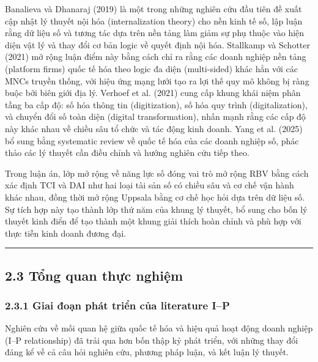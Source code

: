 \documentclass[12pt,a4paper]{article}
\begin{document}
Banalieva và Dhanaraj (2019) là một trong những nghiên cứu đầu tiên đề
xuất cập nhật lý thuyết nội hóa (internalization theory) cho nền kinh tế
số, lập luận rằng dữ liệu số và tương tác dựa trên nền tảng làm giảm sự
phụ thuộc vào hiện diện vật lý và thay đổi cơ bản logic về quyết định
nội hóa. Stallkamp và Schotter (2021) mở rộng luận điểm này bằng cách
chỉ ra rằng các doanh nghiệp nền tảng (platform firms) quốc tế hóa theo
logic đa diện (multi-sided) khác hẳn với các MNCs truyền thống, với hiệu
ứng mạng lưới tạo ra lợi thế quy mô không bị ràng buộc bởi biên giới địa
lý. Verhoef et al. (2021) cung cấp khung khái niệm phân tầng ba cấp độ:
số hóa thông tin (digitization), số hóa quy trình (digitalization), và
chuyển đổi số toàn diện (digital transformation), nhấn mạnh rằng các cấp
độ này khác nhau về chiều sâu tổ chức và tác động kinh doanh. Yang et
al. (2025) bổ sung bằng systematic review về quốc tế hóa của các doanh
nghiệp số, phác thảo các lý thuyết cần điều chỉnh và hướng nghiên cứu
tiếp theo.

Trong luận án, lớp mở rộng về năng lực số đóng vai trò mở rộng RBV bằng
cách xác định TCI và DAI như hai loại tài sản số có chiều sâu và cơ chế
vận hành khác nhau, đồng thời mở rộng Uppsala bằng cơ chế học hỏi dựa
trên dữ liệu số. Sự tích hợp này tạo thành lớp thứ năm của khung lý
thuyết, bổ sung cho bốn lý thuyết kinh điển để tạo thành một khung giải
thích hoàn chỉnh và phù hợp với thực tiễn kinh doanh đương đại.

\begin{center}\rule{0.5\linewidth}{0.5pt}\end{center}

\hypertarget{23-tux1ed5ng-quan-thux1ef1c-nghiux1ec7m}{%
\subsection{2.3 Tổng quan thực
nghiệm}\label{23-tux1ed5ng-quan-thux1ef1c-nghiux1ec7m}}

\hypertarget{231-giai-ux111oux1ea1n-phuxe1t-triux1ec3n-cux1ee7a-literature-ip}{%
\subsubsection{2.3.1 Giai đoạn phát triển của literature
I--P}\label{231-giai-ux111oux1ea1n-phuxe1t-triux1ec3n-cux1ee7a-literature-ip}}

Nghiên cứu về mối quan hệ giữa quốc tế hóa và hiệu quả hoạt động doanh
nghiệp (I--P relationship) đã trải qua hơn bốn thập kỷ phát triển, với
những thay đổi đáng kể về cả câu hỏi nghiên cứu, phương pháp luận, và
kết luận lý thuyết.
\end{document}
